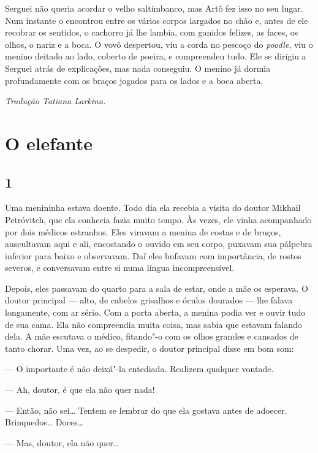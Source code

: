 Serguei não queria acordar o velho saltimbanco, mas Artô fez isso no seu
lugar. Num instante o encontrou entre os vários corpos largados no chão
e, antes de ele recobrar os sentidos, o cachorro já lhe lambia, com
ganidos felizes, as faces, os olhos, o nariz e a boca. O vovô despertou,
viu a corda no pescoço do \emph{poodle}, viu o menino deitado ao lado,
coberto de poeira, e compreendeu tudo. Ele se dirigiu a Serguei atrás de
explicações, mas nada conseguiu. O menino já dormia profundamente com os
braços jogados para os lados e a boca aberta.


\medskip

{\footnotesize\hfill\emph{Tradução Tatiana Larkina.}}

\chapter{O elefante}\label{part11}

\section{1}

\noindent{}Uma menininha estava doente. Todo dia ela recebia a visita do doutor
Mikhail Petróvitch, que ela conhecia fazia muito tempo. Às vezes, ele
vinha acompanhado por dois médicos estranhos. Eles viravam a menina de
costas e de bruços, auscultavam aqui e ali, encostando o ouvido em seu
corpo, puxavam sua pálpebra inferior para baixo e observavam. Daí eles
bufavam com importância, de rostos severos, e conversavam entre si numa
língua incompreensível.

Depois, eles passavam do quarto para a sala de estar, onde a mãe os
esperava. O doutor principal --- alto, de cabelos grisalhos e óculos
dourados --- lhe falava longamente, com ar sério. Com a porta aberta, a
menina podia ver e ouvir tudo de sua cama. Ela não compreendia muita
coisa, mas sabia que estavam falando dela. A mãe escutava o médico,
fitando"-o com os olhos grandes e cansados de tanto chorar. Uma vez, ao
se despedir, o doutor principal disse em bom som:

--- O importante é não deixá"-la entediada. Realizem qualquer vontade.

--- Ah, doutor, é que ela não quer nada!

--- Então, não sei\ldots{} Tentem se lembrar do que ela gos­tava antes de
adoecer. Brinquedos\ldots{} Doces\ldots{}

--- Mas, doutor, ela não quer\ldots{}

